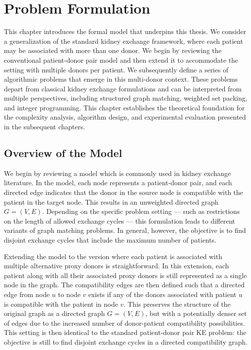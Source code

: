 \chapter{Problem Formulation}
\label{cha:problem_formulation}

This chapter introduces the formal model that underpins this thesis. We consider a generalization of the standard kidney exchange framework, where each patient may be associated with more than one donor. We begin by reviewing the conventional patient-donor pair model and then extend it to accommodate the setting with multiple donors per patient. We subsequently define a series of algorithmic problems that emerge in this multi-donor context. These problems depart from classical kidney exchange formulations and can be interpreted from multiple perspectives, including structured graph matching, weighted set packing, and integer programming. This chapter establishes the theoretical foundation for the complexity analysis, algorithm design, and experimental evaluation presented in the subsequent chapters.

\section{Overview of the Model}

We begin by reviewing a model which is commonly used in kidney exchange literature. In the model, each node represents a patient-donor pair, and each directed edge indicates that the donor in the source node is compatible with the patient in the target node. This results in an unweighted directed graph $G = (V, E)$. Depending on the specific problem setting — such as restrictions on the length of allowed exchange cycles — this formulation leads to different variants of graph matching problems. In general, however, the objective is to find disjoint exchange cycles that include the maximum number of patients.

Extending the model to the version where each patient is associated with multiple alternative proxy donors is straightforward. In this extension, each patient along with all their associated proxy donors is still represented as a single node in the graph. The compatibility edges are then defined such that a directed edge from node $u$ to node $v$ exists if any of the donors associated with patient $u$ is compatible with the patient in node $v$. This preserves the structure of the original graph as a directed graph $G = (V, E)$, but with a potentially denser set of edges due to the increased number of donor-patient compatibility possibilities. This setting is then identical to the standard patient-donor pair \ac{KE} problem: the objective is still to find disjoint exchange cycles in a directed compatibility graph.

